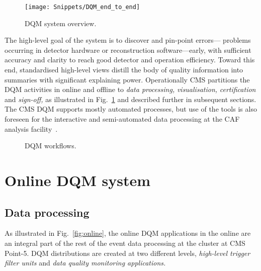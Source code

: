 \documentclass[a4paper]{jpconf}
\begin{document}
\begin{figure}[!b]
\begin{center}
\texttt{[image: Snippets/DQM\_end\_to\_end]}
\end{center}
\caption{\label{fig:overview}DQM system overview.}
\end{figure}

The high-level goal of the system is to discover and pin-point errors---%
problems occurring in detector hardware or reconstruction software---early,
with sufficient accuracy and clarity to reach good detector and operation
efficiency.  Toward this end, standardised high-level views distill the body
of quality information into summaries with significant explaining power.
Operationally CMS partitions the DQM activities in online and offline to {\em
  data processing,} {\em visualisation,} {\em certification} and {\em
  sign-off,} as illustrated in Fig.~\ref{fig:overview} and described further
in subsequent sections.  The CMS DQM supports mostly automated processes, but
use of the tools is also foreseen for the interactive and semi-automated data
processing at the CAF analysis facility~\cite{cms_caf_09}.

\begin{figure}[!b]
\begin{center}
\hspace{1in}
\caption{\label{fig:systems}DQM workflows.}
\end{center}
\end{figure}


\section{Online DQM system}
\subsection{Data processing}

As illustrated in Fig.~\ref{fig:online}, the online DQM applications in the
online are an integral part of the rest of the event data processing at the
cluster at CMS Point-5.  DQM distributions are created at two different
levels, {\em high-level trigger filter units} and {\em data quality monitoring
  applications.}
\end{document}
